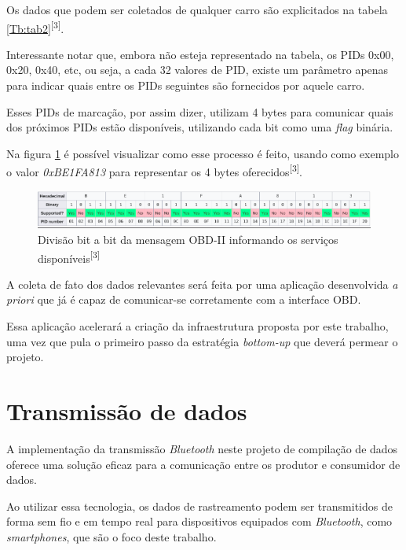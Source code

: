 Os dados que podem ser coletados de qualquer carro são explicitados na tabela \ref{Tb:tab2}\textsuperscript{[3]}.



Interessante notar que, embora não esteja representado na tabela, os PIDs 0x00, 0x20, 0x40, etc, ou seja, a cada 32 valores de PID, existe um parâmetro apenas para indicar quais entre os PIDs seguintes são fornecidos por aquele carro.

Esses PIDs de marcação, por assim dizer, utilizam 4 bytes para comunicar quais dos próximos PIDs estão disponíveis, utilizando cada bit como uma \textit{flag} binária. 

Na figura \ref{fig:bitwise_obd2} é possível visualizar como esse processo é feito, usando como exemplo o valor \textit{0xBE1FA813} para representar os 4 bytes oferecidos\textsuperscript{[3]}.

\begin{figure}[hp]
    \centering
    
    \includegraphics[scale=0.7]{figures/tabela_dados_disponiveis.png}
    
    \caption{Divisão bit a bit da mensagem OBD-II informando os serviços disponíveis\textsuperscript{[3]}}
    
    \label{fig:bitwise_obd2}
\end{figure}

A coleta de fato dos dados relevantes será feita por uma aplicação desenvolvida \textit{a priori} que já é capaz de comunicar-se corretamente com a interface OBD.

Essa aplicação acelerará a criação da infraestrutura proposta por este trabalho, uma vez que pula o primeiro passo da estratégia \textit{bottom-up} que deverá permear o projeto.

\section{Transmissão de dados}

A implementação da transmissão \textit{Bluetooth} neste projeto de compilação de dados oferece uma solução eficaz para a comunicação entre os produtor e consumidor de dados. 

Ao utilizar essa tecnologia, os dados de rastreamento podem ser transmitidos de forma sem fio e em tempo real para dispositivos equipados com \textit{Bluetooth}, como \textit{smartphones}, que são o foco deste trabalho.

